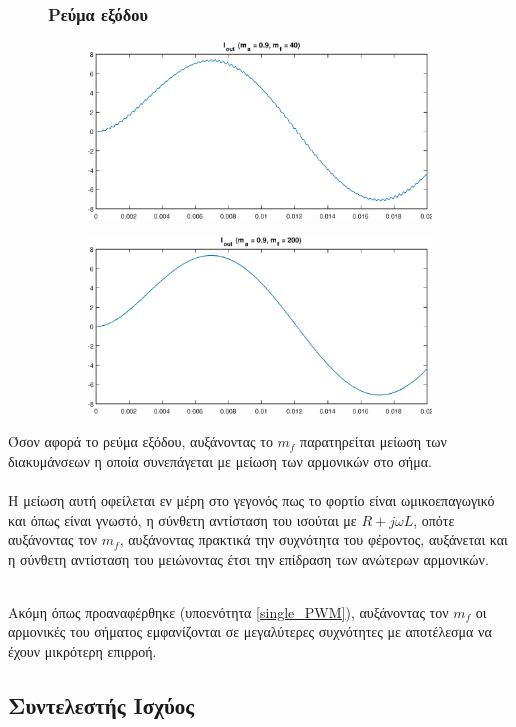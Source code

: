 \begin{figure}[h!]
	\subsubsection*{Ρεύμα εξόδου}
	\begin{subfigure}{0.49\textwidth}
		\centering
		\includegraphics[width=1\textwidth]{Images/I_out_40}
	\end{subfigure}
	\begin{subfigure}{0.49\textwidth}
		\centering
		\includegraphics[width=1\textwidth]{Images/I_out_200}
	\end{subfigure}
\end{figure}
\noindent
Όσον αφορά το ρεύμα εξόδου, αυξάνοντας το $m_f$ παρατηρείται μείωση των διακυμάνσεων η οποία συνεπάγεται με μείωση των αρμονικών στο σήμα.\\\\
Η μείωση αυτή οφείλεται εν μέρη στο γεγονός πως το φορτίο είναι ωμικοεπαγωγικό και όπως είναι γνωστό, η σύνθετη αντίσταση του ισούται με $R + j\omega L$, οπότε αυξάνοντας τον $m_f$, αυξάνοντας πρακτικά την συχνότητα του φέροντος, αυξάνεται και η σύνθετη αντίσταση του μειώνοντας  έτσι την επίδραση των ανώτερων αρμονικών.

\noindent\\
 Ακόμη όπως προαναφέρθηκε (υποενότητα \ref{single_PWM}), αυξάνοντας τον $m_f$ οι αρμονικές του σήματος εμφανίζονται σε μεγαλύτερες συχνότητες με αποτέλεσμα να έχουν μικρότερη επιρροή.

\subsection{Συντελεστής Ισχύος}
